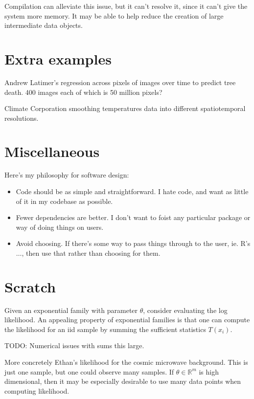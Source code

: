 \documentclass[12pt]{article}
\begin{document}
Compilation can alleviate this issue, but it can't resolve it, since it
can't give the system more memory. It may be able to help reduce the
creation of large intermediate data objects.


\section{Extra examples}

Andrew Latimer's regression across pixels of images over time to predict
tree death. 400 images each of which is 50 million pixels?

Climate Corporation smoothing temperatures data into different
spatiotemporal resolutions.

\section{Miscellaneous}

Here's my philosophy for software design:

\begin{itemize}
    \item Code should be as simple and straightforward. I hate code, and want as
        little of it in my codebase as possible.
    \item Fewer dependencies are better. I don't want to foist any
        particular package or way of doing things on users.
    \item Avoid choosing. If there's some way to pass things through to the
        user, ie. R's $\dots$, then use that rather than choosing for them.
\end{itemize}

\section{Scratch}

Given an exponential family with parameter $\theta$, consider evaluating
the log likelihood. An appealing property of exponential families is that
one can compute the likelihood for an iid sample by summing the
sufficient statistics $T(x_i)$.

TODO: Numerical issues with sums this large.

More concretely Ethan's likelihood for the cosmic microwave background. 
This is just one sample, but one could observe many samples.
If $\theta \in \mathbb{R}^m$ is high dimensional, then it may be
especially desirable to use many data points when computing likelihood.
\end{document}
